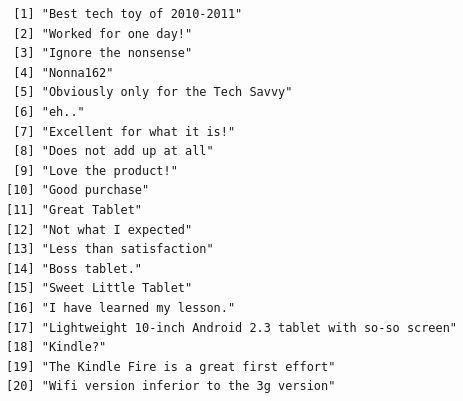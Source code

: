 \begin{Shaded}
\begin{Highlighting}[]
\NormalTok{(} \NormalTok{)}

\OtherTok{\textless{}{-}} \NormalTok{(}\NormalTok{)}

\OtherTok{\textless{}{-}} \SpecialCharTok{$}

\NormalTok{(}\NormalTok{)}

\OtherTok{\textless{}{-}} \NormalTok{))}
\end{Highlighting}
\end{Shaded}

\begin{verbatim}
 [1] "Best tech toy of 2010-2011"                              
 [2] "Worked for one day!"                                     
 [3] "Ignore the nonsense"                                     
 [4] "Nonna162"                                                
 [5] "Obviously only for the Tech Savvy"                       
 [6] "eh.."                                                    
 [7] "Excellent for what it is!"                               
 [8] "Does not add up at all"                                  
 [9] "Love the product!"                                       
[10] "Good purchase"                                           
[11] "Great Tablet"                                            
[12] "Not what I expected"                                     
[13] "Less than satisfaction"                                  
[14] "Boss tablet."                                            
[15] "Sweet Little Tablet"                                     
[16] "I have learned my lesson."                               
[17] "Lightweight 10-inch Android 2.3 tablet with so-so screen"
[18] "Kindle?"                                                 
[19] "The Kindle Fire is a great first effort"                 
[20] "Wifi version inferior to the 3g version"                 
\end{verbatim}

